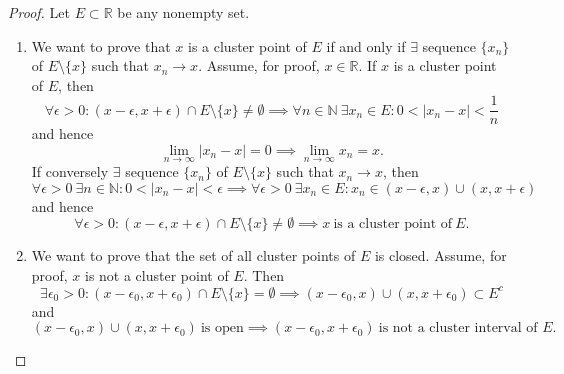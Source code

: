 \documentclass[12pt]{article}
\theoremstyle{definition}
\begin{document}
\begin{proof}
    Let $E \subset \mathbb{R}$ be any nonempty set. 
    \begin{enumerate}[label=(\alph*)]
        \item We want to prove that $x$ is a cluster point of $E$ if and only if $\exists$ sequence $\{x_n\}$ of $E \setminus \{x\}$ such that $x_n \to x$. Assume, for proof, $x \in \mathbb{R}$. If $x$ is a cluster point of $E$, then
        \[
            \forall \epsilon > 0 : (x - \epsilon, x + \epsilon) \cap E \setminus \{x\} \neq \emptyset \implies \forall n \in \mathbb{N} \ \exists x_n \in E : 0 < \vert x_n - x \vert < \frac{1}{n}
        \]
        and hence
        \[
            \lim_{n \to \infty}\vert x_n - x \vert = 0 \implies \lim_{n \to \infty}x_n = x.
        \]
        If conversely $\exists$ sequence $\{x_n\}$ of $E \setminus \{x\}$ such that $x_n \to x$, then
        \[
            \forall \epsilon > 0 \ \exists n \in \mathbb{N} : 0 < \vert x_n - x \vert < \epsilon \implies \forall \epsilon > 0 \ \exists x_n \in E : x_n \in (x - \epsilon, x) \cup (x, x + \epsilon)
        \]
        and hence
        \[
            \forall \epsilon > 0 : (x - \epsilon, x +\epsilon) \cap E \setminus \{x\} \neq \emptyset \implies x \ \text{is a cluster point of} \ E.
        \]
        \item We want to prove that the set of all cluster points of $E$ is closed. Assume, for proof, $x$ is not a cluster point of $E$. Then
        \[
            \exists \epsilon_0 > 0 : (x - \epsilon_0, x + \epsilon_0) \cap E \setminus \{x\} = \emptyset \implies (x - \epsilon_0, x) \cup (x, x + \epsilon_0) \subset E^c
        \]
        and
        \[
            (x - \epsilon_0, x) \cup (x, x + \epsilon_0) \ \text{is open} \implies (x - \epsilon_0, x + \epsilon_0) \ \text{is not a cluster interval of $E$}.
        \]

        \end{enumerate}
\end{proof}
\end{document}
